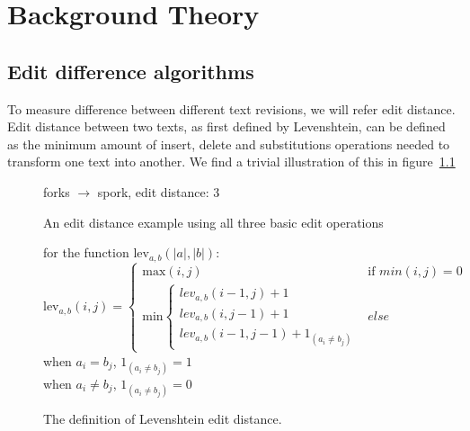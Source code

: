 \chapter{Background Theory}
\label{ch:background}

\section{Edit difference algorithms}
To measure difference between different text revisions, we will refer
edit distance. Edit distance between two texts, as first defined by
Levenshtein,\cite{Levenshtein1966} can be defined as the minimum
amount of insert, delete and substitutions operations needed to
transform one text into another. We find a trivial illustration of
this in figure~\ref{fig:fork-spork}

\begin{figure}
  \centering
  

  \vspace{3 mm}

  forks $\rightarrow$ spork, edit distance: 3
  
  \caption{An edit distance example using all three basic edit
    operations}
  \label{fig:fork-spork}
\end{figure}

\begin{figure}
  \label{fig:levdef}
  \centering
  for the function $\mbox{lev}_{a,b}(|a|,|b|)$:\\
  $$\mbox{lev}_{a,b}(i,j) = 
  \left\{
  \begin{array}{ll}
    \mbox{max}(i,j) & \mbox{if }min(i,j) = 0\\
    \mbox{min}\left\{
    \begin{array}{lll}
      lev_{a,b}(i-1,j)+1\\
      lev_{a,b}(i,j-1)+1\\
      lev_{a,b}(i-1,j-1)+1_{(a_i{\neq}b_j)}
    \end{array}
    \right.
    & else 
  \end{array}
  \right.$$
  when $a_i = b_j$, $1_{(a_i{\neq}b_j)} = 1$\\
  when  $a_i \neq b_j$, $1_{(a_i{\neq}b_j)} = 0$
  \caption{The definition of Levenshtein edit distance.}
\end{figure}

